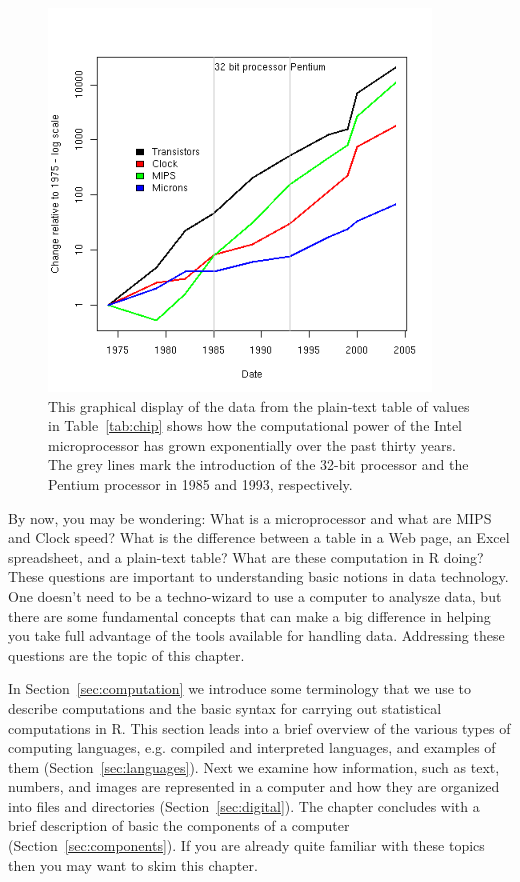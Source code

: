 \begin{figure}
\begin{center}
\includegraphics[height=4in]{computerIntro/images/bestChips.png}
\caption{This graphical display of the data from the plain-text table
  of values in Table~\ref{tab:chip} shows how the computational
  power of the Intel microprocessor has grown exponentially over the
  past thirty years. The grey lines mark the introduction of the
  32-bit processor and the Pentium processor in 1985 and 1993,
  respectively.}
\label{fig:chip}
\end{center}
\end{figure}

By now, you may be wondering: What is a microprocessor and what are
MIPS and Clock speed?  What is the difference between a table in a Web
page, an Excel spreadsheet, and a plain-text table?  What are these
computation in R doing?  These questions are important to
understanding basic notions in data technology.  One doesn't need to
be a techno-wizard to use a computer to analysze data, but there are
some fundamental concepts that can make a big difference in helping
you take full advantage of the tools available for handling data.
Addressing these questions are the topic of this chapter.

In Section~\ref{sec:computation} we introduce some terminology that we
use to describe computations and the basic syntax for carrying out
statistical computations in R.  This section leads into a brief
overview of the various types of computing languages, e.g. compiled
and interpreted languages, and examples of them
(Section~\ref{sec:languages}).  Next we examine how information, such
as text, numbers, and images are represented in a computer and how
they are organized into files and directories
(Section~\ref{sec:digital}).  The chapter concludes with a brief
description of basic the components of a computer
(Section~\ref{sec:components}). If you are already quite familiar with
these topics then you may want to skim this chapter.



